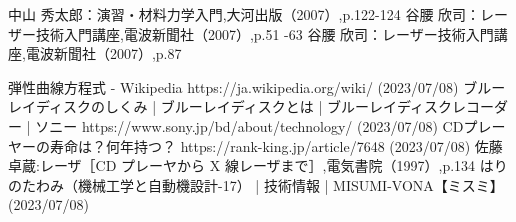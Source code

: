 \documentclass[a4paper,11pt]{jsarticle}
\begin{document}
\begin{thebibliography}{20}
  \bibitem{} 
  中山 秀太郎：演習・材料力学入門,大河出版（2007）,p.122-124
  \bibitem{} 
  谷腰 欣司：レーザー技術入門講座,電波新聞社（2007）,p.51 -63
  \bibitem{}
  谷腰 欣司：レーザー技術入門講座,電波新聞社（2007）,p.87
  
  \bibitem{}
  弾性曲線方程式 - Wikipedia https://ja.wikipedia.org/wiki/ (2023/07/08)
  \bibitem{} 
  ブルーレイディスクのしくみ | ブルーレイディスクとは | ブルーレイディスクレコーダー | ソニー https://www.sony.jp/bd/about/technology/ (2023/07/08)
  \bibitem{} 
  CDプレーヤーの寿命は？何年持つ？ https://rank-king.jp/article/7648 (2023/07/08)
  \bibitem{}
  佐藤卓蔵:レーザ［CD プレーヤから X 線レーザまで］,電気書院（1997）,p.134
  \bibitem{}
  はりのたわみ（機械工学と自動機設計-17） | 技術情報 | MISUMI-VONA【ミスミ】(2023/07/08)
\end{thebibliography}
\end{document}
